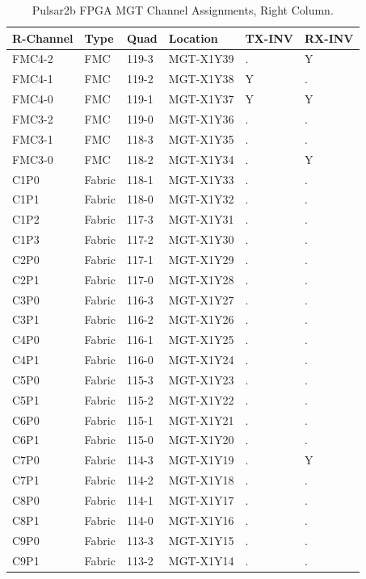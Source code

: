 \documentclass[letterpaper]{article}
\begin{document}
\begin{table}[htp]
\centering
\caption{Pulsar2b FPGA MGT Channel Assignments, Right Column.}
\begin{tabular}{|l|l|l|l|l|l|} \hline
R-Channel & Type & Quad & Location & TX-INV & RX-INV \\ \hline
FMC4-2 & FMC & 119-3 & MGT-X1Y39 & . & Y\\ \hline
FMC4-1 & FMC & 119-2 & MGT-X1Y38 & Y & .\\ \hline
FMC4-0 & FMC & 119-1 & MGT-X1Y37 & Y & Y\\ \hline
FMC3-2 & FMC & 119-0 & MGT-X1Y36 & . & .\\ \hline
FMC3-1 & FMC & 118-3 & MGT-X1Y35 & . & .\\ \hline
FMC3-0 & FMC & 118-2 & MGT-X1Y34 & . & Y\\ \hline
C1P0 & Fabric & 118-1 & MGT-X1Y33 & . & .\\ \hline
C1P1 & Fabric & 118-0 & MGT-X1Y32 & . & .\\ \hline
C1P2 & Fabric & 117-3 & MGT-X1Y31 & . & .\\ \hline
C1P3 & Fabric & 117-2 & MGT-X1Y30 & . & .\\ \hline
C2P0 & Fabric & 117-1 & MGT-X1Y29 & . & .\\ \hline
C2P1 & Fabric & 117-0 & MGT-X1Y28 & . & .\\ \hline
C3P0 & Fabric & 116-3 & MGT-X1Y27 & . & .\\ \hline
C3P1 & Fabric & 116-2 & MGT-X1Y26 & . & .\\ \hline
C4P0 & Fabric & 116-1 & MGT-X1Y25 & . & .\\ \hline
C4P1 & Fabric & 116-0 & MGT-X1Y24 & . & .\\ \hline
C5P0 & Fabric & 115-3 & MGT-X1Y23 & . & .\\ \hline
C5P1 & Fabric & 115-2 & MGT-X1Y22 & . & .\\ \hline
C6P0 & Fabric & 115-1 & MGT-X1Y21 & . & .\\ \hline
C6P1 & Fabric & 115-0 & MGT-X1Y20 & . & .\\ \hline \hline
C7P0 & Fabric & 114-3 & MGT-X1Y19 & . & Y\\ \hline
C7P1 & Fabric & 114-2 & MGT-X1Y18 & . & .\\ \hline
C8P0 & Fabric & 114-1 & MGT-X1Y17 & . & .\\ \hline
C8P1 & Fabric & 114-0 & MGT-X1Y16 & . & .\\ \hline
C9P0 & Fabric & 113-3 & MGT-X1Y15 & . & .\\ \hline
C9P1 & Fabric & 113-2 & MGT-X1Y14 & . & .\\ \hline

\end{tabular}
\end{table}
\end{document}
